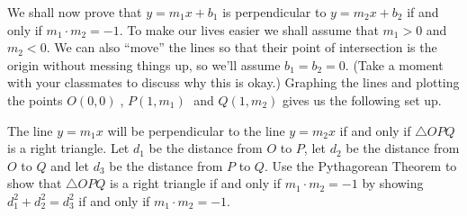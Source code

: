 \documentclass{ximera}
\begin{document}
\begin{problem}\label{perpendicularlineproof}
We shall now prove that $y = m_1x + b_1$ is perpendicular to $y = m_2x + b_2$ if and only if $m_1 \cdot m_2 = -1$.  To make our lives easier we shall assume that $m_1 > 0$ and $m_2 < 0$.  We can also ``move'' the lines so that their point of intersection is the origin without messing things up, so we'll assume $b_1 = b_2 = 0.$  (Take a moment with your classmates to discuss why this is okay.)  Graphing the lines and plotting the points $O(0, 0)\;$, $P(1, m_1)\;$ and $Q(1, m_2)$ gives us the following set up.

\begin{center}
\end{center}

The line $y = m_1x$ will be perpendicular to the line $y = m_2x$ if and only if $\bigtriangleup OPQ$ is a right triangle.  Let $d_1$ be the distance from $O$ to $P$, let $d_2$ be the distance from $O$ to $Q$ and let $d_3$ be the distance from $P$ to $Q$.  Use the Pythagorean Theorem to show that $\bigtriangleup OPQ$ is a right triangle if and only if $m_1 \cdot m_2 = -1$ by showing $d_1^{2} + d_2^{2} = d_3^2$ if and only if $m_1 \cdot m_2 = -1$. 

\end{problem}
\end{document}
